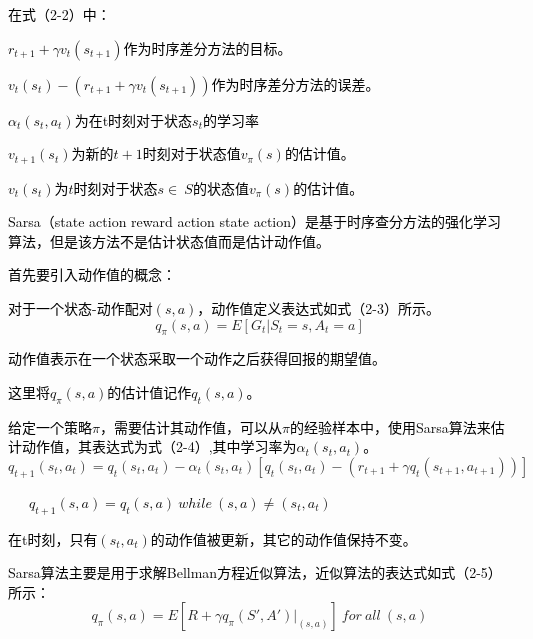 \textcolor{black}{在式（2-2）中：}

\textcolor{black}{$r_{t+1}+\gamma v_{t}(s_{t+1})$作为时序差分方法的目标。}

\textcolor{black}{$v_{t}(s_{t})-(r_{t+1}+\gamma v_{t}(s_{t+1}))$作为时序差分方法的误差。}

\textcolor{black}{$\alpha_{t}(s_{t},a_{t})$为在{t}时刻对于状态$s_{t}$的学习率}

\textcolor{black}{$v_{t+1}(s_{t})$为新的$t+1$时刻对于状态值$v_{\pi}(s)$的估计值。}

\textcolor{black}{$v_{t}(s_{t})$为$t$时刻对于状态$s\in\ S$的状态值$v_{\pi}(s)$的估计值。}

\textcolor{black}{Sarsa（state action reward action state action）是基于时序查分方法的强化学习算法，但是该方法不是估计状态值而是估计动作值\cite{ref29}\cite{ref30}。}

\textcolor{black}{首先要引入动作值的概念：}

\textcolor{black}{对于一个状态-动作配对${(s,a)}$，动作值定义表达式如式（2-3）所示。}
\begin{equation}
q_{\pi}\left({s,a}\right)={E}\left[\left.{G}_{t}\right|{S}_{t}{=s,} {A}_{t}{=a} \right] 
\end{equation}

\textcolor{black}{动作值表示在一个状态采取一个动作之后获得回报的期望值。}

\textcolor{black}{这里将${q}_{\pi}\left({s,a}\right)$的估计值记作${q}_{t}\left({s,a}\right)$。}

\textcolor{black}{给定一个策略$\pi$，需要估计其动作值，可以从$\pi$的经验样本中，使用Sarsa算法来估计动作值，其表达式为式（2-4）,其中学习率为$\alpha _{t}(s_{t},a_{t})$。}
\begin{equation}
q_{t+1}(s_{t},a_{t})=q_{t}(s_{t},a_{t})-\alpha _{t}(s_{t},a_{t})[q_{t}(s_{t},a_{t})-(r_{t+1}+\gamma q_{t}(s_{t+1},a_{t+1}))]    
\end{equation}

\textcolor{black}{\ \ \ $q_{t+1}(s,a)=q_{t}(s,a) \ while \ (s,a) \neq (s_{t},a_{t})$}

\textcolor{black}{在t时刻，只有$\left({s}_{t}{,} {a}_{t}\right)$的动作值被更新，其它的动作值保持不变。}

\textcolor{black}{Sarsa算法主要是用于求解Bellman方程近似算法，近似算法的表达式如式（2-5）所示：}
\begin{equation}
{q}_{\pi}({s,a}){=E}[R+\gamma q_{\pi}(S',A')|_{(s,a)}] \ for \ all \ (s,a) 
\end{equation}

